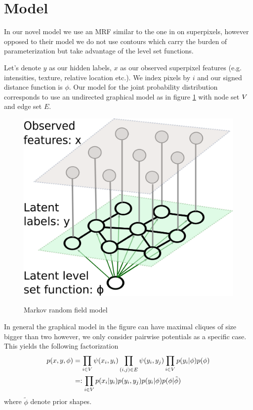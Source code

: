 \documentclass{article} %
\begin{document}
\section{Model}

In our novel model we use an MRF similar to the one in \cite{Huang04_MRFDM} on superpixels, however opposed to their model we do not use contours which carry the burden of parameterization but take advantage of the level set functions. 

Let's denote $y$ as our hidden labels, $x$ as our observed superpixel features (e.g. intensities, texture, relative location etc.). We index pixels by $i$ and our signed distance function is $\phi$. Our model for the joint probability distribution corresponds to use an undirected graphical model as in figure \ref{MRF} with node set $V$ and edge set $E$. 

\begin{figure}[t]
  \centering
  \includegraphics[scale = 0.3]{MRF.pdf}
 \label{MRF}
\caption{Markov random field model}
  \end{figure}

In general the graphical model in the figure can have maximal cliques of size bigger than two however, we only consider pairwise potentials as a specific case. This yields the following factorization
\begin{align}
p(x,y,\phi) &=  \prod_{i\in V} \psi(x_i,y_i)  \prod_{(i,j)\in E} \psi(y_i,y_j)\prod_{i\in V} p(y_i|\phi)p(\phi) \label{total_joint}\\
&=: \prod_{i\in V} p(x_i|y_i)p(y_i,y_j)p(y_i|\phi)p(\phi|\tilde{\phi})\nonumber
\end{align}
where $\tilde{\phi}$ denote prior shapes.
\end{document}
